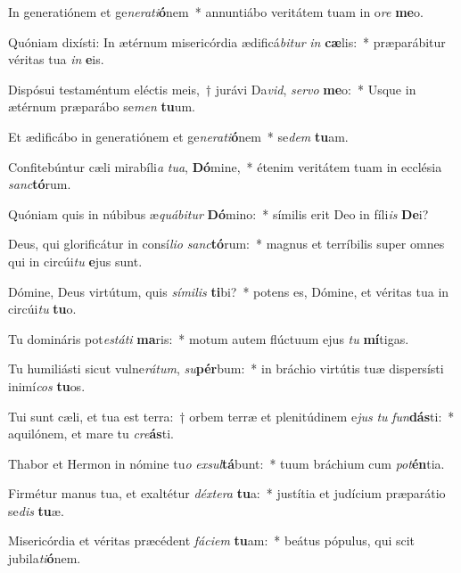 \item In generatiónem et ge\textit{ne}\textit{ra}\textit{ti}\textbf{ó}nem~* annuntiábo veritátem tuam in o\textit{re} \textbf{me}o.
\item Quóniam dixísti: In ætérnum misericórdia ædificá\textit{bi}\textit{tur} \textit{in} \textbf{cæ}lis:~* præparábitur véritas tua \textit{in} \textbf{e}is.
\item Dispósui testaméntum eléctis meis,~† jurávi Da\textit{vid}, \textit{ser}\textit{vo} \textbf{me}o:~* Usque in ætérnum præparábo se\textit{men} \textbf{tu}um.
\item Et ædificábo in generatiónem et ge\textit{ne}\textit{ra}\textit{ti}\textbf{ó}nem~* se\textit{dem} \textbf{tu}am.
\item Confitebúntur cæli mirabíli\textit{a} \textit{tu}\textit{a}, \textbf{Dó}mine,~* étenim veritátem tuam in ecclésia \textit{sanc}\textbf{tó}rum.
\item Quóniam quis in núbibus æ\textit{quá}\textit{bi}\textit{tur} \textbf{Dó}mino:~* símilis erit Deo in fíli\textit{is} \textbf{De}i?
\item Deus, qui glorificátur in consí\textit{li}\textit{o} \textit{sanc}\textbf{tó}rum:~* magnus et terríbilis super omnes qui in circúi\textit{tu} \textbf{e}jus sunt.
\item Dómine, Deus virtútum, quis \textit{sí}\textit{mi}\textit{lis} \textbf{ti}bi?~* potens es, Dómine, et véritas tua in circúi\textit{tu} \textbf{tu}o.
\item Tu domináris pot\textit{es}\textit{tá}\textit{ti} \textbf{ma}ris:~* motum autem flúctuum ejus \textit{tu} \textbf{mí}tigas.
\item Tu humiliásti sicut vulne\textit{rá}\textit{tum}, \textit{su}\textbf{pér}bum:~* in bráchio virtútis tuæ dispersísti inimí\textit{cos} \textbf{tu}os.
\item Tui sunt cæli, et tua est terra:~† orbem terræ et plenitúdinem e\textit{jus} \textit{tu} \textit{fun}\textbf{dás}ti:~* aquilónem, et mare tu \textit{cre}\textbf{ás}ti.
\item Thabor et Hermon in nómine tu\textit{o} \textit{ex}\textit{sul}\textbf{tá}bunt:~* tuum bráchium cum \textit{pot}\textbf{én}tia.
\item Firmétur manus tua, et exaltétur \textit{déx}\textit{te}\textit{ra} \textbf{tu}a:~* justítia et judícium præparátio se\textit{dis} \textbf{tu}æ.
\item Misericórdia et véritas præcédent \textit{fá}\textit{ci}\textit{em} \textbf{tu}am:~* beátus pópulus, qui scit jubila\textit{ti}\textbf{ó}nem.
